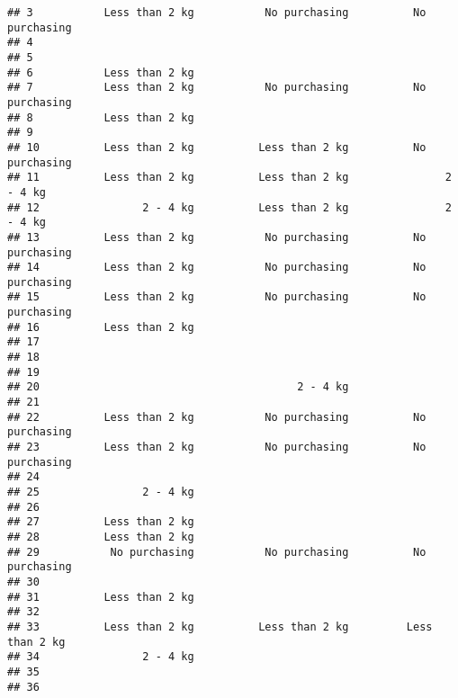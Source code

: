 \documentclass[
]{article}
\begin{document}
\begin{verbatim}
## 3           Less than 2 kg           No purchasing          No purchasing
## 4                                                                        
## 5                                                                        
## 6           Less than 2 kg                                               
## 7           Less than 2 kg           No purchasing          No purchasing
## 8           Less than 2 kg                                               
## 9                                                                        
## 10          Less than 2 kg          Less than 2 kg          No purchasing
## 11          Less than 2 kg          Less than 2 kg               2 - 4 kg
## 12                2 - 4 kg          Less than 2 kg               2 - 4 kg
## 13          Less than 2 kg           No purchasing          No purchasing
## 14          Less than 2 kg           No purchasing          No purchasing
## 15          Less than 2 kg           No purchasing          No purchasing
## 16          Less than 2 kg                                               
## 17                                                                       
## 18                                                                       
## 19                                                                       
## 20                                        2 - 4 kg                       
## 21                                                                       
## 22          Less than 2 kg           No purchasing          No purchasing
## 23          Less than 2 kg           No purchasing          No purchasing
## 24                                                                       
## 25                2 - 4 kg                                               
## 26                                                                       
## 27          Less than 2 kg                                               
## 28          Less than 2 kg                                               
## 29           No purchasing           No purchasing          No purchasing
## 30                                                                       
## 31          Less than 2 kg                                               
## 32                                                                       
## 33          Less than 2 kg          Less than 2 kg         Less than 2 kg
## 34                2 - 4 kg                                               
## 35                                                                       
## 36                                                                       

\end{verbatim}
\end{document}
